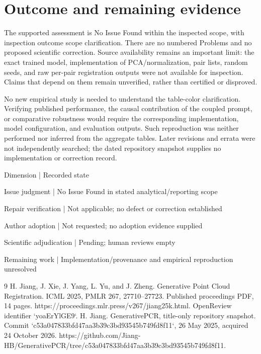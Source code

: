 \documentclass[10pt]{article}
\begin{document}
\section*{Outcome and remaining evidence}
The supported assessment is No Issue Found within the inspected scope, with inspection outcome scope clarification. There are no numbered Problems and no proposed scientific correction. Source availability remains an important limit: the exact trained model, implementation of PCA/normalization, pair lists, random seeds, and raw per-pair registration outputs were not available for inspection. Claims that depend on them remain unverified, rather than certified or disproved.\par
No new empirical study is needed to understand the table-color clarification. Verifying published performance, the causal contribution of the coupled prompt, or comparative robustness would require the corresponding implementation, model configuration, and evaluation outputs. Such reproduction was neither performed nor inferred from the aggregate tables. Later revisions and errata were not independently searched; the dated repository snapshot supplies no implementation or correction record.\par
Dimension | Recorded state\par
Issue judgment | No Issue Found in stated analytical/reporting scope\par
Repair verification | Not applicable; no defect or correction established\par
Author adoption | Not requested; no adoption evidence supplied\par
Scientific adjudication | Pending; human reviews empty\par
Remaining work | Implementation/provenance and empirical reproduction unresolved\par
9 H. Jiang, J. Xie, J. Yang, L. Yu, and J. Zheng. Generative Point Cloud Registration. ICML 2025, PMLR 267, 27710–27723. Published proceedings PDF, 14 pages. https://proceedings.mlr.press/v267/jiang25k.html. OpenReview identifier `yoaErYlGE9`. H. Jiang. GenerativePCR, title-only repository snapshot. Commit `c53a047833bfd47aa3b39c3bd93545b749fd8f11`, 26 May 2025, acquired 24 October 2026. https://github.com/Jiang-HB/GenerativePCR/tree/c53a047833bfd47aa3b39c3bd93545b749fd8f11.\par
\end{document}
